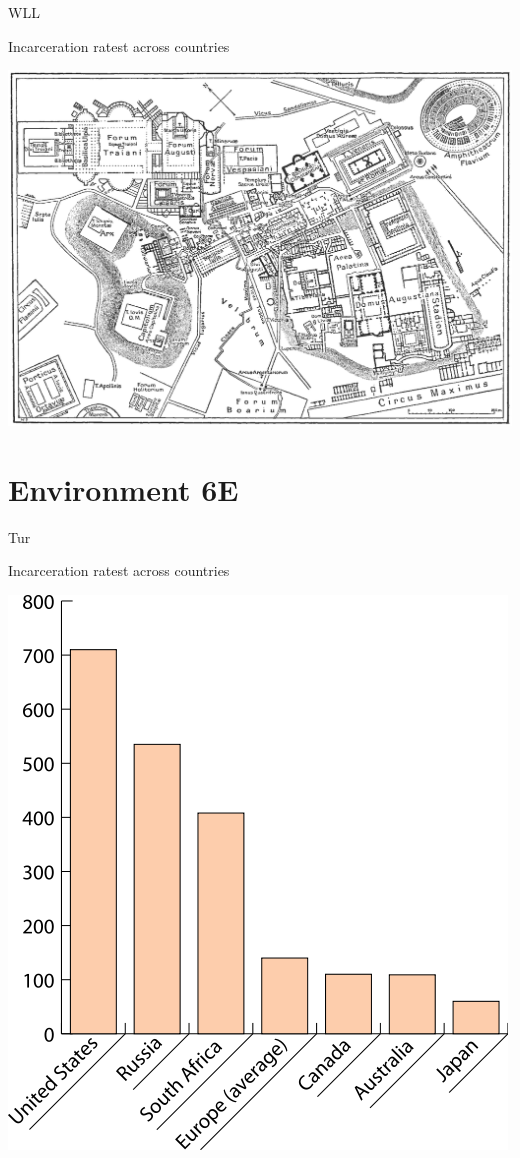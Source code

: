 \begin{map}{W}{LL}
\caption{Incarceration ratest across countries}
\label{chart:incarceration}
\includegraphics[width=\chartwidth,height=\chartheight]{Rome}  
\end{map}
%
%
\section{Environment 6E}

\lipsum[1-4]

\begin{chart}{T}{ur}
\caption{Incarceration ratest across countries}
\label{chart:incarceration}
\includegraphics[width=\chartwidth,height=\chartheight]{incarceration}  
\end{chart}

